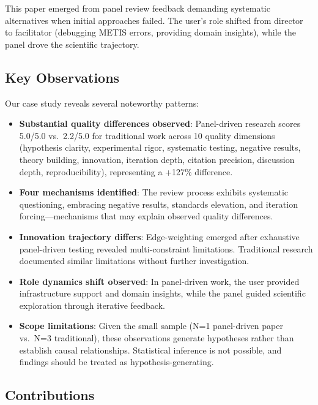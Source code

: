 This paper emerged from panel review feedback demanding systematic alternatives when initial approaches failed. The user's role shifted from director to facilitator (debugging METIS errors, providing domain insights), while the panel drove the scientific trajectory.

\subsection{Key Observations}

Our case study reveals several noteworthy patterns:

\begin{itemize}[leftmargin=*]
\item \textbf{Substantial quality differences observed}: Panel-driven research scores 5.0/5.0 vs.\ 2.2/5.0 for traditional work across 10 quality dimensions (hypothesis clarity, experimental rigor, systematic testing, negative results, theory building, innovation, iteration depth, citation precision, discussion depth, reproducibility), representing a +127\% difference.

\item \textbf{Four mechanisms identified}: The review process exhibits systematic questioning, embracing negative results, standards elevation, and iteration forcing---mechanisms that may explain observed quality differences.

\item \textbf{Innovation trajectory differs}: Edge-weighting emerged after exhaustive panel-driven testing revealed multi-constraint limitations. Traditional research documented similar limitations without further investigation.

\item \textbf{Role dynamics shift observed}: In panel-driven work, the user provided infrastructure support and domain insights, while the panel guided scientific exploration through iterative feedback.

\item \textbf{Scope limitations}: Given the small sample (N=1 panel-driven paper vs.\ N=3 traditional), these observations generate hypotheses rather than establish causal relationships. Statistical inference is not possible, and findings should be treated as hypothesis-generating.
\end{itemize}

\subsection{Contributions}

